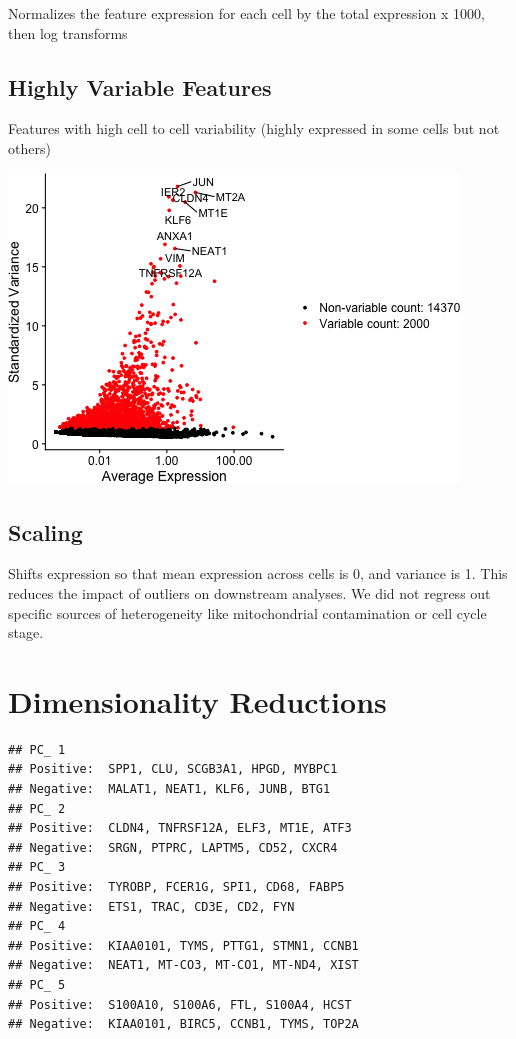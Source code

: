 \documentclass[]{article}
\begin{document}
Normalizes the feature expression for each cell by the total expression
x 1000, then log transforms

\hypertarget{highly-variable-features}{%
\subsection{Highly Variable Features}\label{highly-variable-features}}

Features with high cell to cell variability (highly expressed in some
cells but not others)

\includegraphics{figures/variable-features-1.png}

\hypertarget{scaling}{%
\subsection{Scaling}\label{scaling}}

Shifts expression so that mean expression across cells is 0, and
variance is 1. This reduces the impact of outliers on downstream
analyses. We did not regress out specific sources of heterogeneity like
mitochondrial contamination or cell cycle stage.

\hypertarget{dimensionality-reductions}{%
\section{Dimensionality Reductions}\label{dimensionality-reductions}}

\begin{verbatim}
## PC_ 1 
## Positive:  SPP1, CLU, SCGB3A1, HPGD, MYBPC1 
## Negative:  MALAT1, NEAT1, KLF6, JUNB, BTG1 
## PC_ 2 
## Positive:  CLDN4, TNFRSF12A, ELF3, MT1E, ATF3 
## Negative:  SRGN, PTPRC, LAPTM5, CD52, CXCR4 
## PC_ 3 
## Positive:  TYROBP, FCER1G, SPI1, CD68, FABP5 
## Negative:  ETS1, TRAC, CD3E, CD2, FYN 
## PC_ 4 
## Positive:  KIAA0101, TYMS, PTTG1, STMN1, CCNB1 
## Negative:  NEAT1, MT-CO3, MT-CO1, MT-ND4, XIST 
## PC_ 5 
## Positive:  S100A10, S100A6, FTL, S100A4, HCST 
## Negative:  KIAA0101, BIRC5, CCNB1, TYMS, TOP2A
\end{verbatim}
\end{document}
